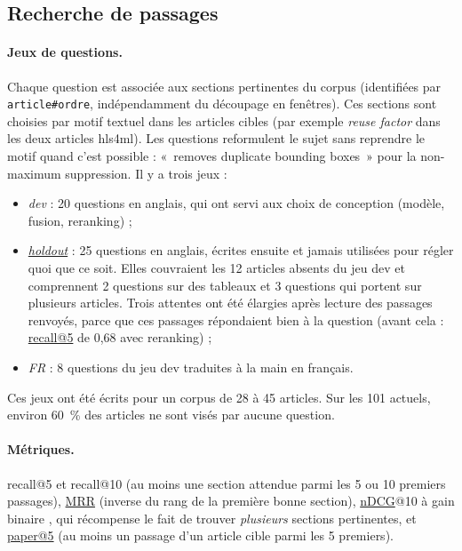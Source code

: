 \documentclass[11pt,a4paper]{article}
\newcommand{\cmd}[1]{\texttt{#1}}
\newcommand{\gl}[2]{\hyperlink{gl:#1}{\textcolor{glcolor}{#2}}}
\begin{document}
\subsection{Recherche de passages}
\label{sec:eval}

\paragraph{Jeux de questions.} Chaque question est associée aux sections pertinentes du
corpus (identifiées par \cmd{article\#ordre}, indépendamment du découpage en fenêtres).
Ces sections sont choisies par motif textuel dans les articles cibles (par exemple
\emph{reuse factor} dans les deux articles hls4ml). Les questions reformulent le sujet sans
reprendre le motif quand c'est possible : «~removes duplicate bounding boxes~» pour la
non-maximum suppression. Il y a trois jeux :
\begin{itemize}
  \item \emph{dev} : 20 questions en anglais, qui ont servi aux choix de conception (modèle,
    fusion, reranking) ;
  \item \emph{\gl{holdout}{holdout}} : 25 questions en anglais, écrites ensuite et jamais utilisées pour
    régler quoi que ce soit. Elles couvraient les 12 articles absents du jeu dev et
    comprennent 2 questions sur des tableaux et 3 questions qui portent sur plusieurs
    articles. Trois attentes ont été élargies après lecture des passages renvoyés, parce que
    ces passages répondaient bien à la question (avant cela : \gl{recall}{recall@5} de 0,68 avec
    reranking) ;
  \item \emph{FR} : 8 questions du jeu dev traduites à la main en français.
\end{itemize}
Ces jeux ont été écrits pour un corpus de 28 à 45 articles. Sur les 101 actuels, environ
60~\% des articles ne sont visés par aucune question.

\paragraph{Métriques.} recall@5 et recall@10 (au moins une section attendue parmi les 5 ou
10 premiers passages), \gl{MRR}{MRR} (inverse du rang de la première bonne section), \gl{nDCG}{nDCG}@10 à gain
binaire \citep{jarvelin2002ndcg}, qui récompense le fait de trouver \emph{plusieurs}
sections pertinentes, et \gl{paperk}{paper@5} (au moins un passage d'un article cible parmi les 5
premiers).
\end{document}
